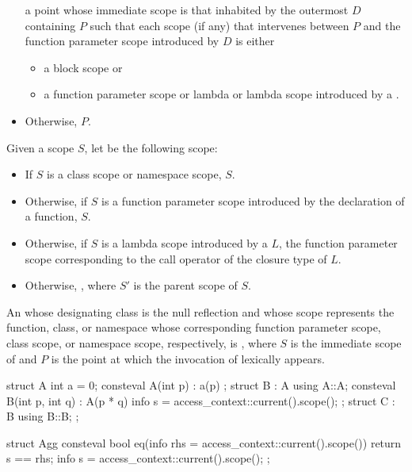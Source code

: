 \begin{itemdescr}
\begin{itemize}
    a point whose immediate scope is that inhabited
    by the outermost  $D$
    containing $P$ such that each scope (if any) that intervenes between $P$
    and the function parameter scope introduced by $D$ is either
    \begin{itemize}
    \item
      a block scope or
    \item
      a function parameter scope or lambda or lambda scope
      introduced by a .
    \end{itemize}
  \item
    Otherwise, $P$.
\end{itemize}

\pnum
Given a scope $S$,
let  be the following scope:
\begin{itemize}
\item
  If $S$ is a class scope or namespace scope,
  $S$.
\item
  Otherwise, if $S$ is a function parameter scope
  introduced by the declaration of a function,
  $S$.
\item
  Otherwise, if $S$ is a lambda scope
  introduced by a  $L$,
  the function parameter scope
  corresponding to the call operator of the closure type of $L$.
\item
  Otherwise, ,
  where $S'$ is the parent scope of $S$.
\end{itemize}

\pnum
\returns
An  whose designating class is the null reflection
and whose scope represents the function, class, or namespace
whose corresponding function parameter scope, class scope, or namespace scope, respectively,
is ,
where $S$ is the immediate scope of 
and $P$ is the point at which the invocation of  lexically appears.
\begin{example}
\begin{codeblock}
struct A {
  int a = 0;
  consteval A(int p) : a(p) {}
};
struct B : A {
  using A::A;
  consteval B(int p, int q) : A(p * q) {}
  info s = access_context::current().scope();
};
struct C : B { using B::B; };

struct Agg {
  consteval bool eq(info rhs = access_context::current().scope()) {
    return s == rhs;
  }
  info s = access_context::current().scope();
};


\end{codeblock}
\end{example}
\end{itemdescr}
